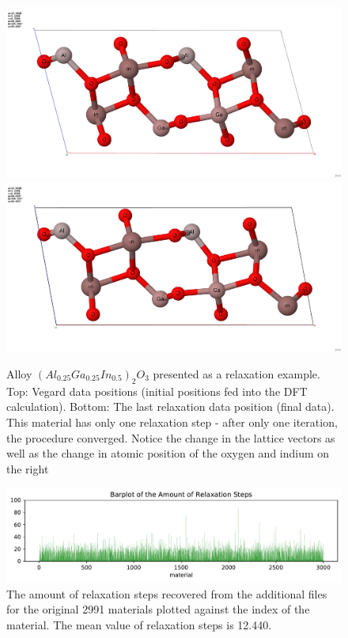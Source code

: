 \documentclass[11pt,oneside,czech,american]{book} %
\theoremstyle{definition} %
\theoremstyle{definition}
\begin{document}
\begin{figure}[H]       
	\includegraphics[scale=0.25]{train_id_20_vegard_hotovo.png}
	\includegraphics[scale=0.25]{train_id_20_final_hotovo.png}
	\caption{Alloy $(Al_{0.25}Ga_{0.25}In_{0.5})_2 O_3$ presented as a relaxation example. Top: Vegard data positions (initial positions fed into the DFT calculation). Bottom: The last relaxation data position (final data). This material has only one relaxation step - after only one iteration, the procedure converged. Notice the change in the lattice vectors as well as the change in atomic position of the oxygen and indium on the right \parencite{jmol}}
	\label{relaxation}
\end{figure}

\begin{figure}[H]
	\includegraphics[scale=0.8]{rsn.pdf}
	\caption{The amount of relaxation steps recovered from the additional files for the original 2991 materials plotted against the index of the material. The mean value of relaxation steps is 12.440.}
	\label{rsn_barplot}
\end{figure}
\end{document}
